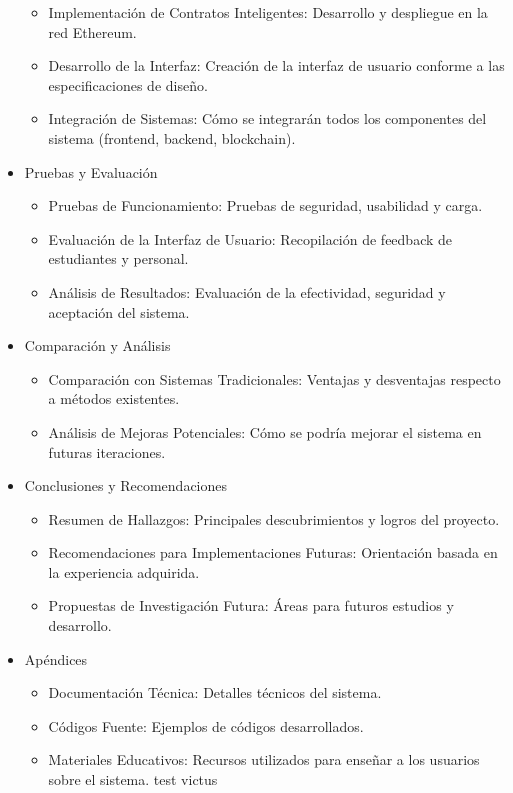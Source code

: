 \documentclass{report}
\begin{document}
\begin{itemize}
\begin{itemize}
			\item Implementación de Contratos Inteligentes: Desarrollo y despliegue en la red Ethereum.
			\item Desarrollo de la Interfaz: Creación de la interfaz de usuario conforme a las especificaciones de diseño.
			\item Integración de Sistemas: Cómo se integrarán todos los componentes del sistema (frontend, backend, blockchain).
		\end{itemize}
		\item Pruebas y Evaluación
		\begin{itemize}
			\item Pruebas de Funcionamiento: Pruebas de seguridad, usabilidad y carga.
			\item Evaluación de la Interfaz de Usuario: Recopilación de feedback de estudiantes y personal.
			\item Análisis de Resultados: Evaluación de la efectividad, seguridad y aceptación del sistema.
		\end{itemize}
		\item Comparación y Análisis
		\begin{itemize}
			\item Comparación con Sistemas Tradicionales: Ventajas y desventajas respecto a métodos existentes.
			\item Análisis de Mejoras Potenciales: Cómo se podría mejorar el sistema en futuras iteraciones.
		\end{itemize}
		\item Conclusiones y Recomendaciones
		\begin{itemize}
			\item Resumen de Hallazgos: Principales descubrimientos y logros del proyecto.
			\item Recomendaciones para Implementaciones Futuras: Orientación basada en la experiencia adquirida.
			\item Propuestas de Investigación Futura: Áreas para futuros estudios y desarrollo.
		\end{itemize}
		\item Apéndices
		\begin{itemize}
			\item Documentación Técnica: Detalles técnicos del sistema.
			\item Códigos Fuente: Ejemplos de códigos desarrollados.
			\item Materiales Educativos: Recursos utilizados para enseñar a los usuarios sobre el sistema. test victus 
		\end{itemize}
	\end{itemize}
	
\end{document}
